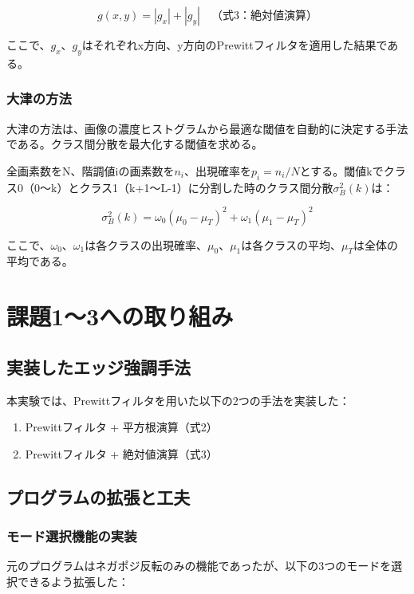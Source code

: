 \documentclass[a4paper,12pt]{jsarticle}
\begin{document}
\begin{equation}
g(x,y) = |g_x| + |g_y| \quad \text{（式3：絶対値演算）}
\end{equation}

ここで、$g_x$、$g_y$はそれぞれx方向、y方向のPrewittフィルタを適用した結果である。

\subsubsection{大津の方法}
大津の方法は、画像の濃度ヒストグラムから最適な閾値を自動的に決定する手法である。クラス間分散を最大化する閾値を求める。

全画素数をN、階調値iの画素数を$n_i$、出現確率を$p_i = n_i/N$とする。閾値kでクラス0（0〜k）とクラス1（k+1〜L-1）に分割した時のクラス間分散$\sigma_B^2(k)$は：

\begin{equation}
\sigma_B^2(k) = \omega_0(\mu_0 - \mu_T)^2 + \omega_1(\mu_1 - \mu_T)^2
\end{equation}

ここで、$\omega_0$、$\omega_1$は各クラスの出現確率、$\mu_0$、$\mu_1$は各クラスの平均、$\mu_T$は全体の平均である。

\section{課題1〜3への取り組み}

\subsection{実装したエッジ強調手法}
本実験では、Prewittフィルタを用いた以下の2つの手法を実装した：

\begin{enumerate}
\item Prewittフィルタ + 平方根演算（式2）
\item Prewittフィルタ + 絶対値演算（式3）
\end{enumerate}

\subsection{プログラムの拡張と工夫}

\subsubsection{モード選択機能の実装}
元のプログラムはネガポジ反転のみの機能であったが、以下の3つのモードを選択できるよう拡張した：
\end{document}
